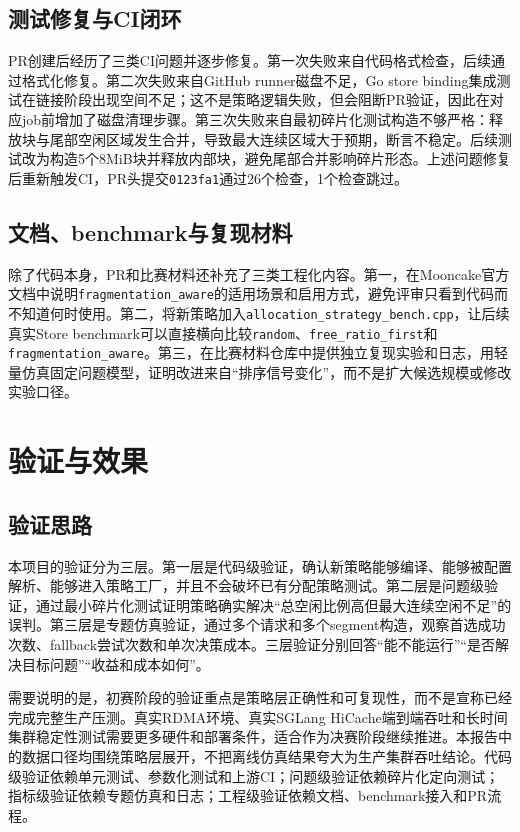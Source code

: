 \documentclass[UTF8,zihao=-4,a4paper]{ctexart}
\newcommand{\artifact}[1]{\texttt{#1}}
\newcommand{\strategy}{\texttt{fragmentation\_aware}}
\newcommand{\baseline}{\texttt{free\_ratio\_first}}
\begin{document}
\subsection{测试修复与CI闭环}

PR创建后经历了三类CI问题并逐步修复。第一次失败来自代码格式检查，后续通过格式化修复。第二次失败来自GitHub runner磁盘不足，Go store binding集成测试在链接阶段出现空间不足；这不是策略逻辑失败，但会阻断PR验证，因此在对应job前增加了磁盘清理步骤。第三次失败来自最初碎片化测试构造不够严格：释放块与尾部空闲区域发生合并，导致最大连续区域大于预期，断言不稳定。后续测试改为构造5个8MiB块并释放内部块，避免尾部合并影响碎片形态。上述问题修复后重新触发CI，PR头提交\artifact{0123fa1}通过26个检查，1个检查跳过。

\subsection{文档、benchmark与复现材料}

除了代码本身，PR和比赛材料还补充了三类工程化内容。第一，在Mooncake官方文档中说明\strategy{}的适用场景和启用方式，避免评审只看到代码而不知道何时使用。第二，将新策略加入\artifact{allocation\_strategy\_bench.cpp}，让后续真实Store benchmark可以直接横向比较\artifact{random}、\baseline{}和\strategy{}。第三，在比赛材料仓库中提供独立复现实验和日志，用轻量仿真固定问题模型，证明改进来自“排序信号变化”，而不是扩大候选规模或修改实验口径。

\section{验证与效果}

\subsection{验证思路}

本项目的验证分为三层。第一层是代码级验证，确认新策略能够编译、能够被配置解析、能够进入策略工厂，并且不会破坏已有分配策略测试。第二层是问题级验证，通过最小碎片化测试证明策略确实解决“总空闲比例高但最大连续空闲不足”的误判。第三层是专题仿真验证，通过多个请求和多个segment构造，观察首选成功次数、fallback尝试次数和单次决策成本。三层验证分别回答“能不能运行”“是否解决目标问题”“收益和成本如何”。

需要说明的是，初赛阶段的验证重点是策略层正确性和可复现性，而不是宣称已经完成完整生产压测。真实RDMA环境、真实SGLang HiCache端到端吞吐和长时间集群稳定性测试需要更多硬件和部署条件，适合作为决赛阶段继续推进。本报告中的数据口径均围绕策略层展开，不把离线仿真结果夸大为生产集群吞吐结论。代码级验证依赖单元测试、参数化测试和上游CI；问题级验证依赖碎片化定向测试；指标级验证依赖专题仿真和日志；工程级验证依赖文档、benchmark接入和PR流程。
\end{document}
